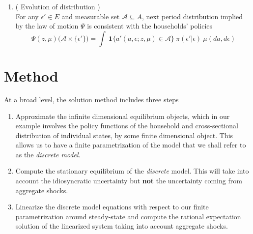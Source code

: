 \documentclass[a4paper,11pt]{article}  %
\begin{document}
\begin{enumerate}
   \item ( Evolution of distribution ) \\
         For any $ \epsilon' \in E $ and measurable set $ \mathcal{A} \subseteq A $, next period distribution implied by the
         law of motion $ \Psi $ is consistent with the households' policies
         \begin{equation}
            \label{eq:law_of_motion}
            \Psi( z, \mu ) \Big( \mathcal{A} \times \{\epsilon'\} \Big) = \int
            \ \mathbf{1} \Big\{  a'( a, \epsilon; z, \mu ) \in \mathcal{A} \Big\} \ \pi( \epsilon' | \epsilon ) \ \mu( da, d \epsilon )
         \end{equation}
\end{enumerate}


\newpage
\section{Method} %
\label{sec:method}

At a broad level, the solution method includes three steps
\begin{enumerate}
   \item Approximate the infinite dimensional equilibrium objects, which in our example involves the
         policy functions of the household and cross-sectional distribution of individual states, by some
         finite dimensional object. This allows us to have a finite parametrization of the model that we
         shall refer to as the \emph{discrete model}.

   \item Compute the stationary equilibrium of the \emph{discrete} model. This will take into account
         the idiosyncratic uncertainty but \textbf{not} the uncertainty coming from aggregate shocks.

   \item Linearize the discrete model equations with respect to our finite parametrization around
         steady-state and compute the rational expectation solution of the linearized system taking into
         account aggregate shocks.
\end{enumerate}
\end{document}
